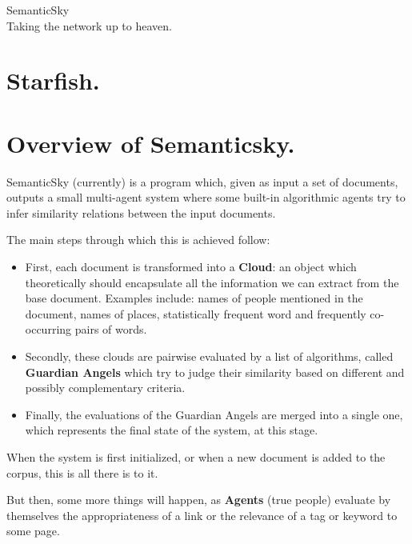 \documentclass[11pt]{article}
\begin{document}
\begin{center}
\huge{SemanticSky} \\ \large{Taking the network up to heaven.}
\end{center}

\tableofcontents
\clearpage

\section{Starfish.}

\section{Overview of Semanticsky.}

SemanticSky (currently) is a program which, given as input a set of documents, outputs a small multi-agent system where some built-in algorithmic agents try to infer similarity relations between the input documents.

The main steps through which this is achieved follow:

\begin{itemize}
\item First, each document is transformed into a {\bf Cloud}: an object which theoretically should encapsulate all the information we can extract from the base document. Examples include: names of people mentioned in the document, names of places, statistically frequent word and frequently co-occurring pairs of words.
\item  Secondly, these clouds are pairwise evaluated by a list of algorithms, called {\bf Guardian Angels} which try to judge their similarity based on different and possibly complementary criteria.
\item Finally, the evaluations of the Guardian Angels are merged into a single one, which represents the final state of the system, at this stage.
\end{itemize}

When the system is first initialized, or when a new document is added to the corpus, this is all there is to it.

But then, some more things will happen, as {\bf Agents} (true people) evaluate by themselves the appropriateness of a link or the relevance of a tag or keyword to some page.
\end{document}
